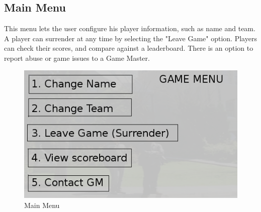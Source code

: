 \documentclass{article}
\begin{document}
\subsection{Main Menu}
This menu lets the user configure his player information, such as name and team. A player can surrender at any time by selecting the "Leave Game" option. Players can check their scores, and compare against a leaderboard. There is an option to report abuse or game issues to a Game Master.
\begin{figure}[htb]
\centering
\includegraphics[scale=0.5]{main-menu}
\caption{Main Menu}
\end{figure}
\end{document}
